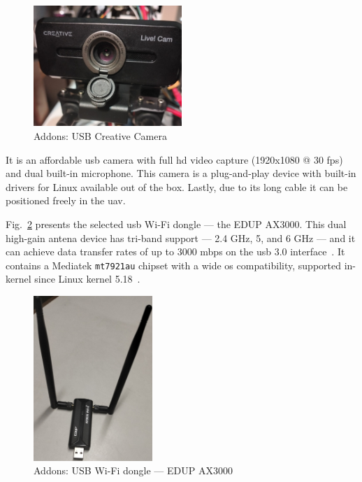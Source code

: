 \begin{figure}[!hbt]
  \centering
  \includegraphics[width=0.5\textwidth]{./img/jpg/creative-cam} 
  \caption{Addons: USB Creative Camera}%
  \label{fig:usb-cam}
\end{figure}

It is an affordable \gls{usb} camera with full
\gls{hd} video capture (1920x1080 @ 30 \gls{fps}) and dual built-in
microphone. This camera is a plug-and-play device with built-in drivers for
Linux available out of the box. Lastly, due to its long cable it can be
positioned freely in the \gls{uav}. 

Fig.~\ref{fig:usb-wifi} presents the selected \gls{usb} Wi-Fi dongle --- the
EDUP AX3000. This dual high-gain antena device has tri-band support --- 2.4 GHz, 5, and 6
GHz --- and it can achieve data transfer rates
of up to 3000 \gls{mbps} on the \gls{usb} 3.0 interface~\cite{ax3000-specs}. It contains a Mediatek
\texttt{mt7921au} chipset with a wide \gls{os} compatibility, supported
in-kernel since Linux kernel 5.18~\cite{ax3000-linux}.

\begin{figure}[!hbt]
  \centering
  \includegraphics[width=0.4\textwidth]{./img/jpg/ax3000} 
  \caption{Addons: USB Wi-Fi dongle --- EDUP AX3000}%
  \label{fig:usb-wifi}
\end{figure}

